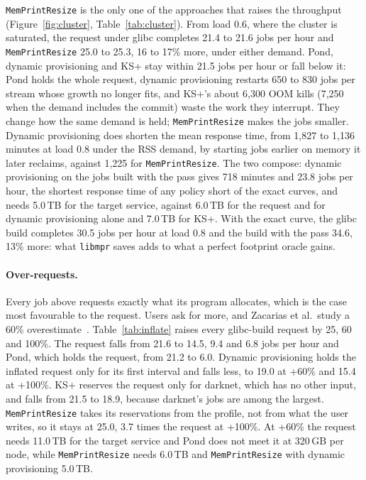 \documentclass[11pt]{article}
\newcommand{\libmpr}{\texttt{libmpr}}
\newcommand{\pass}{\texttt{MemPrintResize}}
\newcommand{\figref}[1]{Figure~\ref{#1}}
\newcommand{\tabref}[1]{Table~\ref{#1}}
\begin{document}
\pass{} is the only one of the approaches that raises the throughput (\figref{fig:cluster}, \tabref{tab:cluster}).
From load 0.6, where the cluster is saturated, the request under glibc completes 21.4 to 21.6 jobs per hour and
\pass{} 25.0 to 25.3, 16 to 17\% more, under either demand. Pond, dynamic provisioning and KS+ stay within 21.5 jobs
per hour or fall below it: Pond holds the whole request, dynamic provisioning restarts 650 to 830 jobs per stream
whose growth no longer fits, and KS+'s about 6{,}300 OOM kills (7{,}250 when the demand includes the commit) waste
the work they interrupt. They change how the same demand is held; \pass{} makes the jobs smaller. Dynamic provisioning
does shorten the mean response time, from 1{,}827 to 1{,}136 minutes at load 0.8 under the RSS demand, by starting
jobs earlier on memory it later reclaims, against 1{,}225 for \pass{}. The two compose: dynamic provisioning on the
jobs built with the pass gives 718 minutes and 23.8 jobs per hour, the shortest response time of any policy short of
the exact curves, and needs 5.0\,TB for the target service, against 6.0\,TB for the request and for dynamic
provisioning alone and 7.0\,TB for KS+. With the exact curve, the glibc build completes 30.5 jobs per hour at load
0.8 and the build with the pass 34.6, 13\% more: what \libmpr{} saves adds to what a perfect footprint oracle gains.

\begin{table}[t]
\centering\small
\resizebox{\textwidth}{!}{}
\caption{Throughput and mean response time at offered load 0.8 (demand = RSS) when each job built without the pass
requests more than its program allocates, as a user who over-requests would. The builds with the pass take their
requests from the profile, so they do not change.}
\label{tab:inflate}
\end{table}

\paragraph{Over-requests.} Every job above requests exactly what its program allocates, which is the case most
favourable to the request. Users ask for more, and Zacarias et al.\ study a 60\% overestimate~\cite{Zacarias2023Dynamic}.
\tabref{tab:inflate} raises every glibc-build request by 25, 60 and 100\%. The request falls from 21.6 to 14.5, 9.4
and 6.8 jobs per hour and Pond, which holds the request, from 21.2 to 6.0. Dynamic provisioning holds the inflated
request only for its first interval and falls less, to 19.0 at +60\% and 15.4 at +100\%. KS+ reserves the request
only for darknet, which has no other input, and falls from 21.5 to 18.9, because darknet's jobs are among the largest.
\pass{} takes its reservations from the profile, not from what the user writes, so it stays at 25.0, 3.7 times the
request at +100\%. At +60\% the request needs 11.0\,TB for the target service and Pond does not meet it at
320\,GB per node, while \pass{} needs 6.0\,TB and \pass{} with dynamic provisioning 5.0\,TB.
\end{document}
